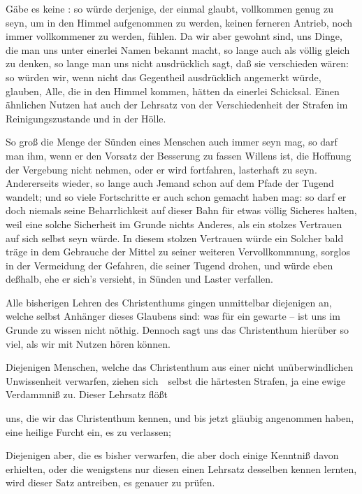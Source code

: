 \begin{aufza}
\item Gäbe es keine : so würde derjenige, der einmal glaubt, vollkommen genug zu seyn, um in den Himmel aufgenommen zu werden, keinen ferneren Antrieb, noch immer vollkommener zu werden, fühlen. Da wir aber gewohnt sind, uns Dinge, die man uns unter einerlei Namen bekannt macht, so lange auch als völlig gleich zu denken, so lange man uns nicht ausdrücklich sagt, daß sie verschieden wären: so würden wir, wenn nicht das Gegentheil ausdrücklich angemerkt würde, glauben, Alle, die in den Himmel kommen, hätten da einerlei Schicksal. Einen ähnlichen Nutzen hat auch der Lehrsatz von der Verschiedenheit der Strafen im Reinigungszustande und in der Hölle.
\item So groß die Menge der Sünden eines Menschen auch immer seyn mag, so darf man ihm, wenn er den Vorsatz der Besserung zu fassen Willens ist, die Hoffnung der Vergebung nicht nehmen, oder er wird fortfahren, lasterhaft zu seyn. Andererseits wieder, so lange auch Jemand schon auf dem Pfade der Tugend wandelt; und so viele Fortschritte er auch schon gemacht haben mag: so darf er doch niemals seine Beharrlichkeit auf dieser Bahn für etwas völlig Sicheres halten, weil eine solche Sicherheit im Grunde nichts Anderes, als ein stolzes Vertrauen auf sich selbst seyn würde. In diesem stolzen Vertrauen würde ein Solcher bald träge in dem Gebrauche der Mittel zu seiner weiteren Vervollkommnung, sorglos in der Vermeidung der Gefahren, die seiner Tugend drohen, und würde eben deßhalb, ehe er sich's versieht, in Sünden und Laster verfallen.
\item Alle bisherigen Lehren des Christenthums gingen unmittelbar diejenigen an, welche selbst Anhänger dieses Glaubens sind: was für ein  gewarte -- ist uns im Grunde zu wissen nicht nöthig. Dennoch sagt uns das Christenthum hierüber so viel, als wir mit Nutzen hören können.
\begin{aufzb}
\item Diejenigen Menschen, welche das Christenthum aus einer nicht unüberwindlichen Unwissenheit verwarfen, ziehen sich~\ selbst die härtesten Strafen, ja eine ewige Verdammniß zu. Dieser Lehrsatz flößt
\begin{aufzc}
\item uns, die wir das Christenthum kennen, und bis jetzt gläubig angenommen haben, eine heilige Furcht ein, es zu verlassen;
\item Diejenigen aber, die es bisher verwarfen, die aber doch einige Kenntniß davon erhielten, oder die wenigstens nur diesen einen Lehrsatz desselben kennen lernten, wird dieser Satz antreiben, es genauer zu prüfen.

\end{aufzc}
\end{aufzb}
\end{aufza}
